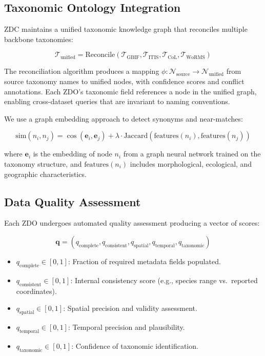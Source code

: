 \subsection{Taxonomic Ontology Integration}

ZDC maintains a unified taxonomic knowledge graph that reconciles multiple backbone taxonomies:

\begin{equation}
    \mathcal{T}_{\text{unified}} = \text{Reconcile}(\mathcal{T}_{\text{GBIF}}, \mathcal{T}_{\text{ITIS}}, \mathcal{T}_{\text{CoL}}, \mathcal{T}_{\text{WoRMS}})
\end{equation}

The reconciliation algorithm produces a mapping $\phi: \mathcal{N}_{\text{source}} \rightarrow \mathcal{N}_{\text{unified}}$ from source taxonomy names to unified nodes, with confidence scores and conflict annotations.
Each ZDO's taxonomic field references a node in the unified graph, enabling cross-dataset queries that are invariant to naming conventions.

We use a graph embedding approach to detect synonyms and near-matches:

\begin{equation}
    \text{sim}(n_i, n_j) = \cos(\mathbf{e}_i, \mathbf{e}_j) + \lambda \cdot \text{Jaccard}(\text{features}(n_i), \text{features}(n_j))
\end{equation}

\noindent where $\mathbf{e}_i$ is the embedding of node $n_i$ from a graph neural network trained on the taxonomy structure, and $\text{features}(n_i)$ includes morphological, ecological, and geographic characteristics.

\subsection{Data Quality Assessment}

Each ZDO undergoes automated quality assessment producing a vector of scores:

\begin{equation}
    \mathbf{q} = (q_{\text{complete}}, q_{\text{consistent}}, q_{\text{spatial}}, q_{\text{temporal}}, q_{\text{taxonomic}})
\end{equation}

\begin{itemize}[leftmargin=*]
    \item $q_{\text{complete}} \in [0,1]$: Fraction of required metadata fields populated.
    \item $q_{\text{consistent}} \in [0,1]$: Internal consistency score (e.g., species range vs.\ reported coordinates).
    \item $q_{\text{spatial}} \in [0,1]$: Spatial precision and validity assessment.
    \item $q_{\text{temporal}} \in [0,1]$: Temporal precision and plausibility.
    \item $q_{\text{taxonomic}} \in [0,1]$: Confidence of taxonomic identification.
\end{itemize}

